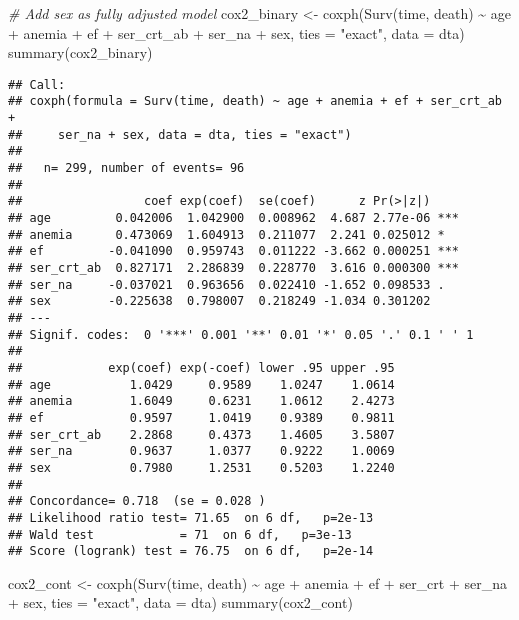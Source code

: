 \documentclass[
]{article}
\newenvironment{Shaded}{\begin{snugshade}}{\end{snugshade}}
\newcommand{\AttributeTok}[1]{\textcolor[rgb]{0.77,0.63,0.00}{#1}}
\newcommand{\CommentTok}[1]{\textcolor[rgb]{0.56,0.35,0.01}{\textit{#1}}}
\newcommand{\FunctionTok}[1]{\textcolor[rgb]{0.00,0.00,0.00}{#1}}
\newcommand{\NormalTok}[1]{#1}
\newcommand{\OtherTok}[1]{\textcolor[rgb]{0.56,0.35,0.01}{#1}}
\newcommand{\SpecialCharTok}[1]{\textcolor[rgb]{0.00,0.00,0.00}{#1}}
\newcommand{\StringTok}[1]{\textcolor[rgb]{0.31,0.60,0.02}{#1}}
\begin{document}
\begin{Shaded}
\begin{Highlighting}[]
\CommentTok{\# Add sex as fully adjusted model}
\NormalTok{cox2\_binary }\OtherTok{\textless{}{-}} \FunctionTok{coxph}\NormalTok{(}\FunctionTok{Surv}\NormalTok{(time, death) }\SpecialCharTok{\textasciitilde{}}\NormalTok{ age }\SpecialCharTok{+}\NormalTok{ anemia }\SpecialCharTok{+}\NormalTok{ ef }\SpecialCharTok{+}\NormalTok{ ser\_crt\_ab }\SpecialCharTok{+}\NormalTok{ ser\_na }\SpecialCharTok{+}\NormalTok{ sex, }\AttributeTok{ties =} \StringTok{"exact"}\NormalTok{, }\AttributeTok{data =}\NormalTok{ dta)}
\FunctionTok{summary}\NormalTok{(cox2\_binary)}
\end{Highlighting}
\end{Shaded}

\begin{verbatim}
## Call:
## coxph(formula = Surv(time, death) ~ age + anemia + ef + ser_crt_ab + 
##     ser_na + sex, data = dta, ties = "exact")
## 
##   n= 299, number of events= 96 
## 
##                 coef exp(coef)  se(coef)      z Pr(>|z|)    
## age         0.042006  1.042900  0.008962  4.687 2.77e-06 ***
## anemia      0.473069  1.604913  0.211077  2.241 0.025012 *  
## ef         -0.041090  0.959743  0.011222 -3.662 0.000251 ***
## ser_crt_ab  0.827171  2.286839  0.228770  3.616 0.000300 ***
## ser_na     -0.037021  0.963656  0.022410 -1.652 0.098533 .  
## sex        -0.225638  0.798007  0.218249 -1.034 0.301202    
## ---
## Signif. codes:  0 '***' 0.001 '**' 0.01 '*' 0.05 '.' 0.1 ' ' 1
## 
##            exp(coef) exp(-coef) lower .95 upper .95
## age           1.0429     0.9589    1.0247    1.0614
## anemia        1.6049     0.6231    1.0612    2.4273
## ef            0.9597     1.0419    0.9389    0.9811
## ser_crt_ab    2.2868     0.4373    1.4605    3.5807
## ser_na        0.9637     1.0377    0.9222    1.0069
## sex           0.7980     1.2531    0.5203    1.2240
## 
## Concordance= 0.718  (se = 0.028 )
## Likelihood ratio test= 71.65  on 6 df,   p=2e-13
## Wald test            = 71  on 6 df,   p=3e-13
## Score (logrank) test = 76.75  on 6 df,   p=2e-14
\end{verbatim}

\begin{Shaded}
\begin{Highlighting}[]
\NormalTok{cox2\_cont }\OtherTok{\textless{}{-}} \FunctionTok{coxph}\NormalTok{(}\FunctionTok{Surv}\NormalTok{(time, death) }\SpecialCharTok{\textasciitilde{}}\NormalTok{ age }\SpecialCharTok{+}\NormalTok{ anemia }\SpecialCharTok{+}\NormalTok{ ef }\SpecialCharTok{+}\NormalTok{ ser\_crt }\SpecialCharTok{+}\NormalTok{ ser\_na }\SpecialCharTok{+}\NormalTok{ sex, }\AttributeTok{ties =} \StringTok{"exact"}\NormalTok{, }\AttributeTok{data =}\NormalTok{ dta)}
\FunctionTok{summary}\NormalTok{(cox2\_cont)}
\end{Highlighting}
\end{Shaded}
\end{document}
